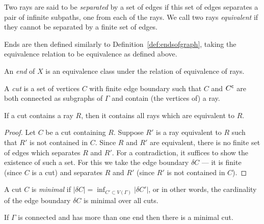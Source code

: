 \begin{definition}
Two rays are said to be \emph{separated} by a set of edges if this set of edges separates a pair of infinite subpaths, one from each of the rays. We call two rays \emph{equivalent} if they cannot be separated by a finite set of edges.
\end{definition}

Ends are then defined similarly to Definition~\ref{def:endsofgraph}, taking the equivalence relation to be equivalence as defined above. %

\begin{definition}
    An \emph{end} of \(X\) is an equivalence class under the relation of equivalence of rays.  
\end{definition}

\begin{definition}[Cut]
 A \emph{cut} is a set of vertices \(C\) with finite edge boundary such that \(C\) and \({C}^{\mathsf{c}}\) are both connected as subgraphs of \(\Gamma\) and contain (the vertices of) a ray.
\end{definition}

\begin{proposition}
    \label{prop:ray}
     If a cut contains a ray \(R\), then it contains all rays which are equivalent to \(R\).
\end{proposition}

\begin{proof}
    Let \(C\) be a cut containing \(R\). Suppose \(R'\) is a ray equivalent to \(R\) such that \(R'\) is not contained in \(C\).
    Since \(R\) and \(R'\) are equivalent, there is no finite set of edges which separates \(R\) and \(R'\). For a contradiction, it suffices to show the existence of such a set. For this we take the edge boundary \(\delta C\) --- it is finite (since \(C\) is a cut) and separates \(R\) and \(R'\) (since \(R'\) is not contained in \(C\)). 
\end{proof}

\begin{definition}
    A cut \(C\) is \emph{minimal} if 
    \(|\delta C| = \inf_{C' \subset V(\Gamma)}{|\delta C'|}\), or in other words,
    the cardinality of the edge boundary \(\delta C\) is minimal over all cuts.
\end{definition}
\begin{lemma}
     If \(\Gamma\) is connected and has more than one end then there is a minimal cut.
\end{lemma}

